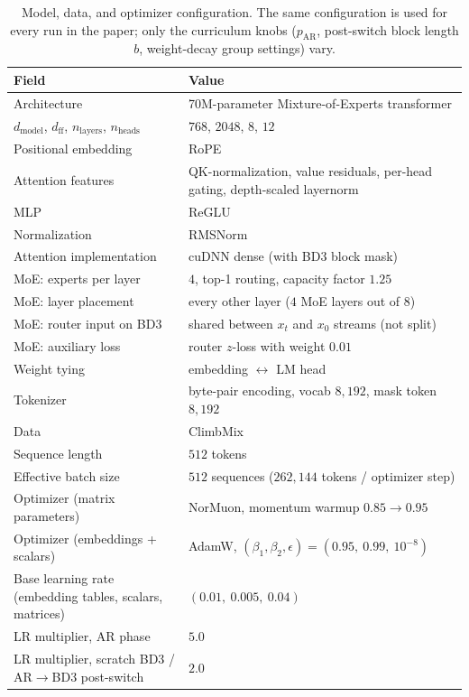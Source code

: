 \documentclass{article}
\newcommand{\pAR}{p_{\mathrm{AR}}}
\begin{document}
\begin{table}[h]
\centering
\caption{Model, data, and optimizer configuration. The same configuration is used for every run in the paper; only the curriculum knobs ($\pAR$, post-switch block length $b$, weight-decay group settings) vary.}
\label{tab:arch}
\small
\begin{tabular}{ll}
\toprule
Field & Value \\
\midrule
Architecture & 70M-parameter Mixture-of-Experts transformer \\
$d_{\mathrm{model}}$, $d_{\mathrm{ff}}$, $n_{\mathrm{layers}}$, $n_{\mathrm{heads}}$ & $768$, $2048$, $8$, $12$ \\
Positional embedding & RoPE \\
Attention features & QK-normalization, value residuals, per-head gating, depth-scaled layernorm \\
MLP & ReGLU \\
Normalization & RMSNorm \\
Attention implementation & cuDNN dense (with BD3 block mask) \\
MoE: experts per layer & $4$, top-1 routing, capacity factor $1.25$ \\
MoE: layer placement & every other layer ($4$ MoE layers out of $8$) \\
MoE: router input on BD3 & shared between $x_t$ and $x_0$ streams (not split) \\
MoE: auxiliary loss & router $z$-loss with weight $0.01$ \\
Weight tying & embedding $\leftrightarrow$ LM head \\
\midrule
Tokenizer & byte-pair encoding, vocab $8{,}192$, mask token $8{,}192$ \\
Data & ClimbMix \\
Sequence length & $512$ tokens \\
Effective batch size & $512$ sequences ($262{,}144$ tokens / optimizer step) \\
\midrule
Optimizer (matrix parameters) & NorMuon, momentum warmup $0.85 \to 0.95$ \\
Optimizer (embeddings + scalars) & AdamW, $(\beta_1, \beta_2, \epsilon) = (0.95,\ 0.99,\ 10^{-8})$ \\
Base learning rate (embedding tables, scalars, matrices) & $(0.01,\ 0.005,\ 0.04)$ \\
LR multiplier, AR phase & $5.0$ \\
LR multiplier, scratch BD3 / AR$\to$BD3 post-switch & $2.0$ \\

\end{tabular}
\end{table}
\end{document}
